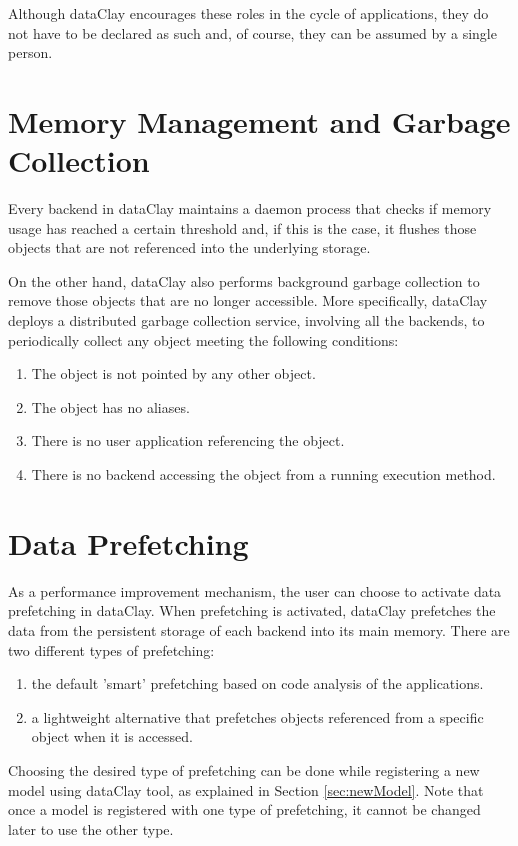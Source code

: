 Although dataClay encourages these roles in the cycle of applications, they do not have to be declared as such and, of course, they can be assumed by a single person.

\section{Memory Management and Garbage Collection}
\label{sec:GarbageCollection}

Every backend in dataClay maintains a daemon process that checks if memory usage has reached a certain threshold and, if this is the case, it flushes those objects that are not referenced into the underlying storage.

On the other hand, dataClay also performs background garbage collection to remove those objects that are no longer accessible. More specifically, dataClay deploys a distributed garbage collection service, involving all the backends, to periodically collect any object meeting the following conditions:
\begin{enumerate}
  \item The object is not pointed by any other object.
  \item The object has no aliases.
  \item There is no user application referencing the object.
  \item There is no backend accessing the object from a running execution method.
\end{enumerate}

\section{Data Prefetching}
\label{sec:prefetching}
As a performance improvement mechanism, the user can choose to activate data prefetching in dataClay. When prefetching is activated, dataClay prefetches the data from the persistent storage of each backend into its main memory. There are two different types of prefetching:
\begin{enumerate}
    \item the default 'smart' prefetching based on code analysis of the applications.
    \item a lightweight alternative that prefetches objects referenced from a specific object when it is accessed.
\end{enumerate}
Choosing the desired type of prefetching can be done while registering a new model using dataClay tool, as explained in Section \ref{sec:newModel}. Note that once a model is registered with one type of prefetching, it cannot be changed later to use the other type.

